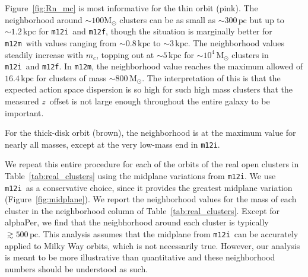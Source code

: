 \documentclass[twocolumn]{aastex62}
\newcommand{\Msun}{\ensuremath{\text{M}_\odot}}
\newcommand{\pc}{\text{pc}}
\newcommand{\kpc}{\text{kpc}}
\newcommand{\mi}{\texttt{m12i}}
\newcommand{\mf}{\texttt{m12f}}
\newcommand{\mm}{\texttt{m12m}}
\newcommand{\thincolor}{pink}
\newcommand{\thickcolor}{brown}
\begin{document}
Figure~\ref{fig:Rn_mc} is most informative for the thin orbit (\thincolor).
The neighborhood around $\sim100\Msun$ clusters can be as small as
$\sim300\,\pc$ but up to $\sim1.2\,\kpc$ for \mi\ and \mf , though the
situation is marginally better for \mm\ with values ranging from
$\sim0.8\,\kpc$ to $\sim3\,\kpc$. The neighborhood values steadily increase
with $m_c$, topping out at $\sim5\,\kpc$ for $\sim10^4\,\Msun$ clusters in
\mi\ and \mf . In \mm , the neighborhood value reaches the maximum allowed of
$16.4\,\kpc$ for clusters of mass $\sim800\,\Msun$. The interpretation of this
is that the expected action space dispersion is so high for such high mass
clusters that the measured $z$~offset is not large enough throughout the
entire galaxy to be important.

For the thick-disk orbit (brown), the neighborhood is at the maximum value for
nearly all masses, except at the very low-mass end in \mi .

We repeat this entire procedure for each of the orbits of the real open
clusters in Table~\ref{tab:real_clusters} using the midplane variations from
\mi . We use \mi\ as a conservative choice, since it provides the greatest
midplane variation (Figure~\ref{fig:midplane}). We report the neighborhood
values for the mass of each cluster in the neighborhood column of
Table~\ref{tab:real_clusters}. Except for alphaPer, we find that the
neigbhorhood around each cluster is typically $\gtrsim 500\,\pc$. This
analysis assumes that the midplane from \mi\ can be accurately applied to
Milky Way orbits, which is not necessarily true. However, our analysis is
meant to be more illustrative than quantitative and these neighborhood numbers
should be understood as such.

\begin{figure*}
\caption{The neighborhood around an open cluster of mass $m_c$ for the thin,
and thick orbits (\thincolor and \thickcolor, respectively; see
Table~\ref{tab:orbits}) and for each of the FIRE galaxies considered here ---
\mi , \mf , and \mm\ ({\em left}, {\em center}, and {\em right} panels,
respectively). Given the $z$ offset for a cluster of mass $m_c$ computed in
Figure~\ref{fig:cluster_offset}, we convert this to a chord length using the
result from Figure~\ref{fig:range_deltaphi}. We interpret this chord length as
the ``neighborhood'' around the cluster, i.e. the distance from the cluster
one could go before the $J_z$ error induced by our midplane effect is
comparable to the intrinsic action dispersion of the cluster. When the $z$
offset is larger than the maximum range in Figure~\ref{fig:range_deltaphi}, we
report the maximum chord length ($2\times8.2\,\kpc$). We aso report the same
procedure but using the $\pm1\sigma$ lines from
Figure~\ref{fig:range_deltaphi}, which we plot here as dashed lines. For the
thick orbit (\thickcolor), the neighborhood is quite large and thus the effect
is negligible. However, for the thin orbit (\thincolor), which is closest to
the orbits of nearby open clusters (see Table~\ref{tab:real_clusters}), the
neighborhood is only a few hundred $\pc$ for low-mass clusters.}
\label{fig:Rn_mc}
\end{figure*}
\end{document}
